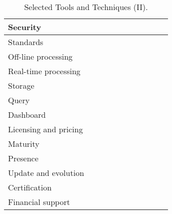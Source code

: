 \begin{sidewaystable}[!ht]
\begin{center}
\begin{tabular}[c]{|p{1.7cm}|p{1.5cm}|p{1.5cm}|p{1.5cm}|p{1.5cm}|p{1.5cm}|p{1.5cm}|p{1.5cm}|p{1.5cm}|p{1.5cm}|p{1.5cm}|}
  Security &  &   &  &  &  &  &  &  &  & \\ \hline  
  Standards &  &   &  &  &  &  &  &  &  & \\ \hline  
  Off-line processing &  &   &  &  &  &  &  &  &  & \\ \hline  
  Real-time processing &  &   &  &  &  &  &  &  &  & \\ \hline  
  Storage &  &   &  &  &  &  &  &  &  & \\ \hline  
  Query &  &   &  &  &  &  &  &  &  & \\ \hline  
  Dashboard &  &   &  &  &  &  &  &  &  & \\ \hline  
  Licensing and pricing &  &   &  &  &  &  &  &  &  & \\ \hline  
  Maturity &  &   &  &  &  &  &  &  &  & \\ \hline  
  Presence &  &   &  &  &  &  &  &  &  & \\ \hline  
  Update and evolution &  &   &  &  &  &  &  &  &  & \\ \hline  
  Certification &  &   &  &  &  &  &  &  &  & \\ \hline  
  Financial support &  &   &  &  &  &  &  &  &  & \\ \hline  

\hline
\end{tabular}
\caption{Selected Tools and Techniques (II).}\label{table:tools-ii}
  \end{center}
\end{sidewaystable} 

